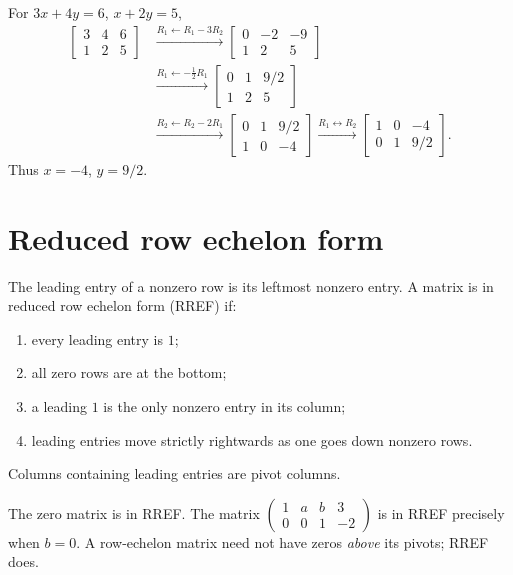 \begin{example}
For $3x+4y=6$, $x+2y=5$,
\begin{align*}
\left[\begin{array}{cc|c}3&4&6\\1&2&5\end{array}\right]
&\xrightarrow{R_1\leftarrow R_1-3R_2}
\left[\begin{array}{cc|c}0&-2&-9\\1&2&5\end{array}\right]\\
&\xrightarrow{R_1\leftarrow-\frac12R_1}
\left[\begin{array}{cc|c}0&1&9/2\\1&2&5\end{array}\right]\\
&\xrightarrow{R_2\leftarrow R_2-2R_1}
\left[\begin{array}{cc|c}0&1&9/2\\1&0&-4\end{array}\right]
\xrightarrow{R_1\leftrightarrow R_2}
\left[\begin{array}{cc|c}1&0&-4\\0&1&9/2\end{array}\right].
\end{align*}
Thus $x=-4$, $y=9/2$.
\end{example}

\section{Reduced row echelon form}
\begin{definition}[RREF]
The leading entry of a nonzero row is its leftmost nonzero entry.
A matrix is in reduced row echelon form (RREF) if:
\begin{enumerate}
\item every leading entry is $1$;
\item all zero rows are at the bottom;
\item a leading $1$ is the only nonzero entry in its column;
\item leading entries move strictly rightwards as one goes down nonzero rows.
\end{enumerate}
Columns containing leading entries are pivot columns.
\end{definition}
The zero matrix is in RREF. The matrix
$\begin{pmatrix}1&a&b&3\\0&0&1&-2\end{pmatrix}$ is in RREF precisely when
$b=0$. A row-echelon matrix need not have zeros \emph{above} its pivots;
RREF does.

